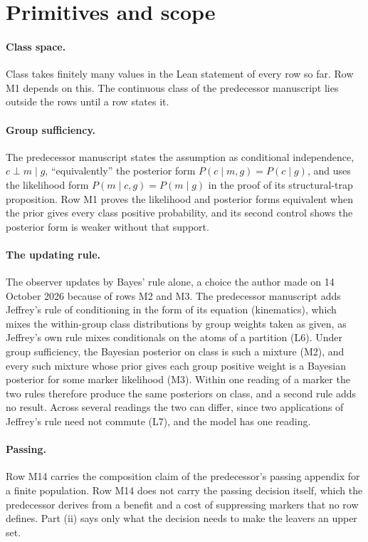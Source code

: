 \section{Primitives and scope}
\label{app:scope}

\paragraph{Class space.} Class takes finitely many values in the Lean
statement of every row so far. Row M1 depends on this. The continuous class of
the predecessor manuscript lies outside the rows until a row states it.

\paragraph{Group sufficiency.} The predecessor manuscript states the
assumption as conditional independence, $c\perp m\mid g$, ``equivalently''
the posterior form $P(c\mid m,g)=P(c\mid g)$, and uses the likelihood form
$P(m\mid c,g)=P(m\mid g)$ in the proof of its structural-trap proposition.
Row M1 proves the likelihood and posterior forms equivalent when the prior
gives every class positive probability, and its second control shows the
posterior form is weaker without that support.

\paragraph{The updating rule.} The observer updates by Bayes' rule alone, a
choice the author made on 14 October 2026 because of rows M2 and M3. The
predecessor manuscript adds Jeffrey's rule of conditioning in the form of its
equation (kinematics), which mixes the within-group class distributions by
group weights taken as given, as Jeffrey's own rule mixes conditionals on
the atoms of a partition (L6). Under group sufficiency, the Bayesian
posterior on class is such a mixture (M2), and every such mixture whose prior
gives each group positive weight is a Bayesian posterior for some marker
likelihood (M3). Within one reading of a marker the two rules therefore
produce the same posteriors on class, and a second rule adds no result.
Across several readings the two can differ, since two applications of
Jeffrey's rule need not commute (L7), and the model has one reading.

\paragraph{Passing.} Row M14 carries the composition claim of the
predecessor's passing appendix for a finite population. Row M14 does not carry
the passing decision itself, which the predecessor derives from a benefit
and a cost of suppressing markers that no row defines. Part (ii) says only
what the decision needs to make the leavers an upper set.

